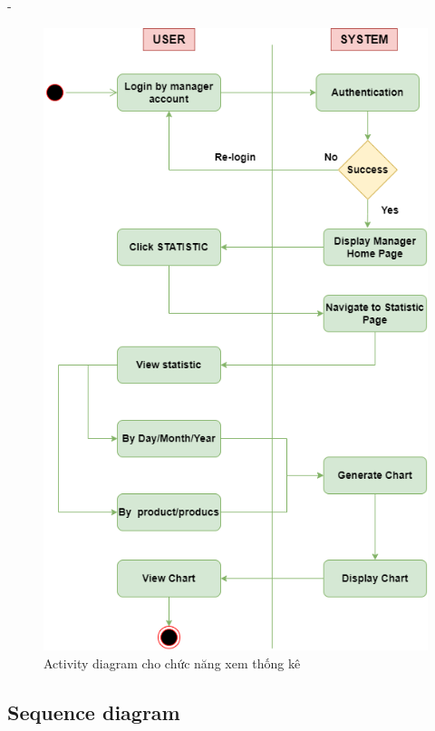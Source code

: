 \begin {list} {-}{}
\begin{figure}[H]
    \centering
    \includegraphics[scale=0.6]{images/hieu/chap-3/Statistic-activity-diagram.png}
    \caption{Activity diagram cho chức năng xem thống kê}
\end{figure}
\newpage
\subsection{Sequence diagram}

\end{list}
